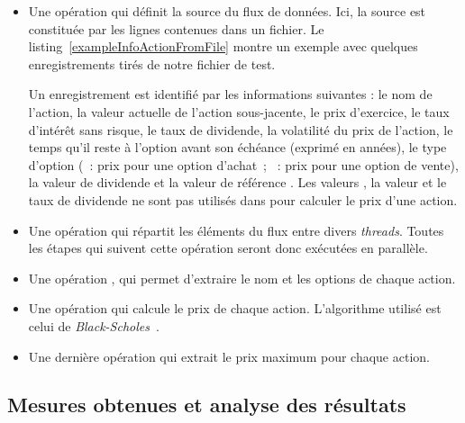 \begin{itemize}

\item Une op\'eration qui d\'efinit la source du flux de donn\'ees. Ici, la source est constitu\'ee par les lignes contenues dans un fichier. Le listing~\ref{exampleInfoActionFromFile} montre un exemple avec quelques enregistrements tir\'es de notre fichier de test. 

Un enregistrement est identifi\'e par les informations suivantes : le nom de l'action, la valeur actuelle de l'action sous-jacente, le prix d'exercice, le taux d'int\'er\^et sans risque, le taux de dividende, la volatilit\'e du prix de l'action, le temps qu'il reste \`a l'option avant son \'ech\'eance (exprim\'e en ann\'ees), le type d'option (~: prix pour une option d'achat~; ~: prix pour une option de vente), la valeur de dividende et la valeur de r\'ef\'erence . 
Les valeurs , la valeur et le taux de dividende ne sont pas utilis\'es dans  pour calculer le prix d'une action.

\item Une op\'eration qui r\'epartit les \'el\'ements du flux entre divers \emph{threads}.
Toutes les \'etapes qui suivent cette op\'eration seront donc ex\'ecut\'ees en parall\`ele.

\item Une op\'eration  , qui permet d'extraire le nom et les options de chaque action.


\item  Une op\'eration qui calcule le prix de chaque action. L'algorithme utilis\'e est celui de \emph{Black-Scholes}~\citep{macbeth1979empirical}. 

\item Une derni\`ere op\'eration qui extrait le prix maximum pour chaque action.


\end{itemize}

\subsection{Mesures obtenues et analyse des r\'esultats}


